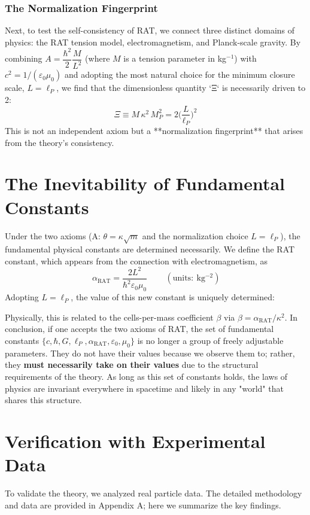 \documentclass[11pt,a4paper]{article}
\newcommand{\rat}{\mathrm{RAT}}
\newcommand{\lp}{\ell_P}
\newcommand{\ar}{\alpha_{\rat}}
\newcommand{\kappaR}{\kappa}
\newcommand{\betaC}{\beta}
\begin{document}
\subsubsection*{The Normalization Fingerprint}
Next, to test the self-consistency of RAT, we connect three distinct domains of physics: the RAT tension model, electromagnetism, and Planck-scale gravity. By combining $A=\dfrac{\hbar^2}{2}\dfrac{M}{L^2}$ (where $M$ is a tension parameter in kg$^{-1}$) with $c^2=1/(\varepsilon_0 \mu_0)$ and adopting the most natural choice for the minimum closure scale, $L=\ell_P$, we find that the dimensionless quantity `Ξ` is necessarily driven to 2:
\begin{equation}
    \boxed{\,\Xi \equiv M\,\kappaR^2\,M_P^2 = 2\Big(\frac{L}{\ell_P}\Big)^2\,}
\end{equation}
This is not an independent axiom but a **normalization fingerprint** that arises from the theory's consistency.

\section{The Inevitability of Fundamental Constants}
Under the two axioms (A: $\theta=\kappaR\sqrt{m}$ and the normalization choice $L=\ell_P$), the fundamental physical constants are determined necessarily. We define the RAT constant, which appears from the connection with electromagnetism, as
\[ \boxed{\,\ar = \frac{2 L^2}{\hbar^2 \varepsilon_0 \mu_0}\,}\qquad(\mathrm{units:\ kg^{-2}}) \]
Adopting $L=\ell_P$, the value of this new constant is uniquely determined:
\begin{center}
    \fbox{\parbox{0.9\textwidth}{\centering \textbf{$\ar = 4.222200526682808 \times 10^{15}\ \mathrm{kg^{-2}}$}}}
\end{center}
Physically, this is related to the cells-per-mass coefficient $\betaC$ via $\betaC=\ar/\kappaR^2$.
In conclusion, if one accepts the two axioms of RAT, the set of fundamental constants $\{ c, \hbar, G, \lp, \ar, \varepsilon_0, \mu_0 \}$ is no longer a group of freely adjustable parameters. They do not have their values because we observe them to; rather, they \textbf{must necessarily take on their values} due to the structural requirements of the theory. As long as this set of constants holds, the laws of physics are invariant everywhere in spacetime and likely in any "world" that shares this structure.

\section{Verification with Experimental Data}
To validate the theory, we analyzed real particle data. The detailed methodology and data are provided in Appendix A; here we summarize the key findings.
\end{document}
